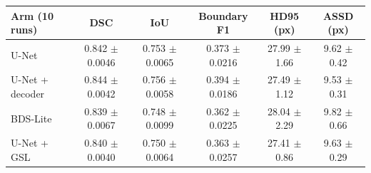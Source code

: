 \begin{tabular}{lccccc}
\toprule
Arm (10 runs) & DSC & IoU & Boundary F1 & HD95 (px) & ASSD (px) \\
\midrule
U-Net & 0.842 $\pm$ 0.0046 & 0.753 $\pm$ 0.0065 & 0.373 $\pm$ 0.0216 & 27.99 $\pm$ 1.66 & 9.62 $\pm$ 0.42 \\
U-Net + decoder & 0.844 $\pm$ 0.0042 & 0.756 $\pm$ 0.0058 & 0.394 $\pm$ 0.0186 & 27.49 $\pm$ 1.12 & 9.53 $\pm$ 0.31 \\
BDS-Lite & 0.839 $\pm$ 0.0067 & 0.748 $\pm$ 0.0099 & 0.362 $\pm$ 0.0225 & 28.04 $\pm$ 2.29 & 9.82 $\pm$ 0.66 \\
U-Net + GSL & 0.840 $\pm$ 0.0040 & 0.750 $\pm$ 0.0064 & 0.363 $\pm$ 0.0257 & 27.41 $\pm$ 0.86 & 9.63 $\pm$ 0.29 \\
\bottomrule
\end{tabular}

